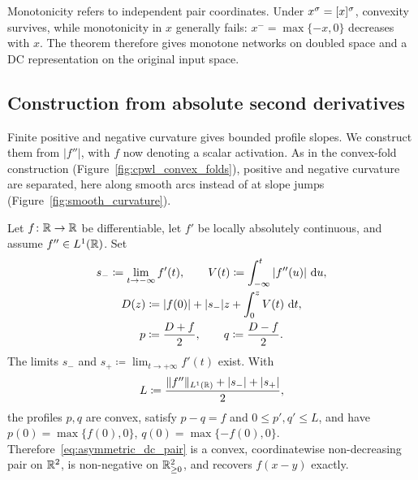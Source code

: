 Monotonicity refers to independent pair coordinates. Under $x^\sigma=[x]^{\sigma}$, convexity survives, while monotonicity in $x$ generally fails: $x^- =\max\{-x,0\}$ decreases with $x$. The theorem therefore gives monotone networks on doubled space and a DC representation on the original input space.

\subsection{Construction from absolute second derivatives}\label{sec:dc_splitting_smooth}

Finite positive and negative curvature gives bounded profile slopes. We construct them from $|f''|$, with $f$ now denoting a scalar activation. As in the convex-fold construction (Figure~\ref{fig:cpwl_convex_folds}), positive and negative curvature are separated, here along smooth arcs instead of at slope jumps (Figure~\ref{fig:smooth_curvature}).

\begin{theoremenv}\label{thm:absolute_curvature_split}
Let $f\colon\mathbb{R}\to\mathbb{R}$ be differentiable, let $f'$ be locally absolutely continuous, and assume $f''\in L^1(\mathbb{R})$. Set
\begin{equation}
\begin{gathered}
    s_-\coloneqq\lim_{t\to-\infty}f'(t),\qquad
    V(t)\coloneqq\int_{-\infty}^{t}|f''(u)|\,\mathop{}\!\textrm{d} u,\\
    D(z)\coloneqq |f(0)|+|s_-|z+\int_0^z V(t)\,\mathop{}\!\textrm{d} t,\\
    p\coloneqq\frac{D+f}{2},\qquad q\coloneqq\frac{D-f}{2}.
\end{gathered}
    \label{eq:absolute_curvature_primitive}
\end{equation}
The limits $s_-$ and $s_+\coloneqq\lim_{t\to+\infty}f'(t)$ exist. With
\begin{equation}
    L\coloneqq\frac{\|f''\|_{L^1(\mathbb{R})}+|s_-|+|s_+|}{2},
    \label{eq:absolute_curvature_coefficient}
\end{equation}
the profiles $p,q$ are convex, satisfy $p-q=f$ and $0\le p',q'\le L$, and have $p(0)=\max\{f(0),0\}$, $q(0)=\max\{-f(0),0\}$. Therefore~\eqref{eq:asymmetric_dc_pair} is a convex, coordinatewise non-decreasing pair on $\mathbb{R}^2$, is non-negative on $\mathbb{R}^2_{\ge0}$, and recovers $f(x-y)$ exactly.
\end{theoremenv}

